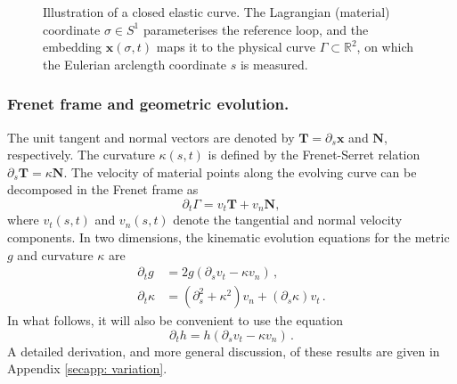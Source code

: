 \documentclass[
aip,
jcp,
reprint, 
floatfix
]{revtex4-1}
\begin{document}
\begin{figure}[h!]
    \caption{
Illustration of a closed elastic curve. The Lagrangian (material) coordinate $\sigma \in S^1$ parameterises the reference loop, and the embedding $\mathbf{x}(\sigma, t)$ maps it to the physical curve $\Gamma \subset \mathbb{R}^2$, on which the Eulerian arclength coordinate $s$ is measured.
}
    \label{fig:curve-mapping}
\end{figure}
\vspace{-30pt}
\subsubsection{Frenet frame and geometric evolution.}
The unit tangent and normal vectors are denoted by $\mathbf{T}=\partial_s \mathbf{x}$ and $\mathbf{N}$, respectively. The curvature $\kappa(s, t)$ is defined by the Frenet-Serret relation
$
\partial_s \mathbf{T}=\kappa \mathbf{N}.
$
The velocity of material points along the evolving curve can be decomposed in the Frenet frame as
\begin{equation}
    \partial_t \Gamma=v_t \mathbf{T}+v_n \mathbf{N},
\end{equation}
where $v_t(s, t)$ and $v_n(s, t)$ denote the tangential and normal velocity components. 
In two dimensions, the kinematic evolution equations for the metric $g$ and curvature $\kappa$ are 
\begin{equation}\label{eq: gtkt}
    \begin{split}
        \partial_t g &= 2g\left( {{\partial _s}{v_t} - \kappa {v_n}} \right)\,,\\
    \partial_t \kappa &=   (\partial _s^2 + \kappa^2 ){v_n} + ({\partial _s}\kappa ){v_t}\,.
    \end{split}
\end{equation}
In what follows, it will also be convenient to use the equation 
\begin{equation} \label{eq: ht}
\partial_t h =h\left( {{\partial _s}{v_t} - \kappa {v_n}} \right)\,.
\end{equation}
A detailed derivation, and more general discussion, of these results are given in Appendix \eqref{secapp: variation}. 
\end{document}

